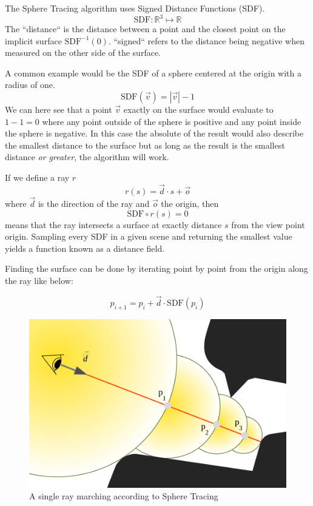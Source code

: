 		The Sphere Tracing algorithm uses Signed Distance Functions (SDF).
		$$\text{SDF}:\mathbb{R}^{3}\mapsto\mathbb{R}$$ The ``distance`` is the
		distance between a point and the closest point on the implicit surface
		$\text{SDF}^{-1}(0)$. ``signed`` refers to the distance being
		negative when measured on the other side of the surface. 

		A common example would be the SDF of a sphere centered at the origin with a
		radius of one. $$\text{SDF}(\vec{v}) = |\vec{v}| - 1$$ We can here see that
		a point $\vec{v}$ exactly on the surface would evaluate to $1 - 1 = 0$
		where any point outside of the sphere is positive and any point inside the
		sphere is negative. In this case the absolute of the result would also
		describe the smallest distance to the surface but as long as the result is
		the smallest distance \emph{or greater}, the algorithm will work.

		If we define a ray $r$ $$r(s) = \vec{d} \cdot s + \vec{o}$$
		where $\vec{d}$ is the direction of the ray and $\vec{o}$ the origin, then
		$$\text{SDF}\circ r(s) = 0$$ means that the ray intersects a surface at
		exactly distance $s$ from the view point origin. Sampling every SDF in a
		given scene and returning the smallest value yields a function known as a
		distance field.

		\bigskip \noindent Finding the surface can be done by iterating point by
		point from the origin along the ray like below: 
		
		$$p_{i+1} = p_i + \vec{d}\cdot \text{SDF}(p_i)$$ 
		
		\vspace{40pt}
		\begin{figure}
			\begin{flushright}
				\includegraphics[width=0.9\linewidth]{figure/SDF2} 
			\end{flushright}
			\caption{A single ray marching according to Sphere Tracing}
			\vspace{40pt}
		\end{figure}

